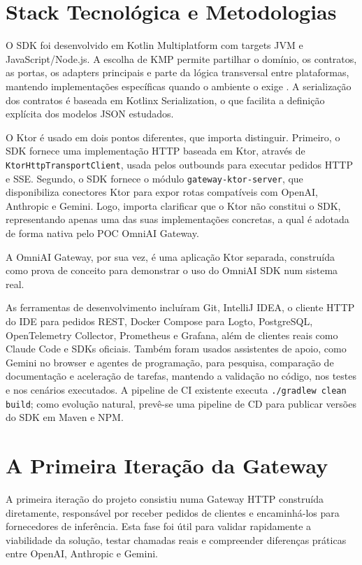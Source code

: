 \documentclass[11pt,a4paper]{report}
\begin{document}
    \section{Stack Tecnológica e Metodologias}
    O SDK foi desenvolvido em Kotlin Multiplatform com targets JVM e JavaScript/Node.js. A escolha de KMP permite partilhar o domínio, os contratos, as portas, os adapters principais e parte da lógica transversal entre plataformas, mantendo implementações específicas quando o ambiente o exige \cite{kotlin_multiplatform}. A serialização dos contratos é baseada em Kotlinx Serialization, o que facilita a definição explícita dos modelos JSON estudados.

    O Ktor é usado em dois pontos diferentes, que importa distinguir. Primeiro, o SDK fornece uma implementação HTTP baseada em Ktor, através de \texttt{KtorHttpTransportClient}, usada pelos outbounds para executar pedidos HTTP e SSE. Segundo, o SDK fornece o módulo \texttt{gateway-ktor-server}, que disponibiliza conectores Ktor para expor rotas compatíveis com OpenAI, Anthropic e Gemini.
    Logo, importa clarificar que o Ktor não constitui o SDK, representando apenas uma das suas implementações concretas, a qual é adotada de forma nativa pelo POC OmniAI Gateway.

    A OmniAI Gateway, por sua vez, é uma aplicação Ktor separada, construída como prova de conceito para demonstrar o uso do OmniAI SDK num sistema real.

    As ferramentas de desenvolvimento incluíram Git, IntelliJ IDEA, o cliente HTTP do IDE para pedidos REST, Docker Compose para Logto, PostgreSQL, OpenTelemetry Collector, Prometheus e Grafana, além de clientes reais como Claude Code e SDKs oficiais. Também foram usados assistentes de apoio, como Gemini no browser e agentes de programação, para pesquisa, comparação de documentação e aceleração de tarefas, mantendo a validação no código, nos testes e nos cenários executados. A pipeline de CI existente executa \texttt{./gradlew clean build}; como evolução natural, prevê-se uma pipeline de CD para publicar versões do SDK em Maven e NPM.

    \section{A Primeira Iteração da Gateway}

    A primeira iteração do projeto consistiu numa Gateway HTTP construída diretamente, responsável por receber pedidos de clientes e encaminhá-los para fornecedores de inferência. Esta fase foi útil para validar rapidamente a viabilidade da solução, testar chamadas reais e compreender diferenças práticas entre OpenAI, Anthropic e Gemini.
\end{document}
